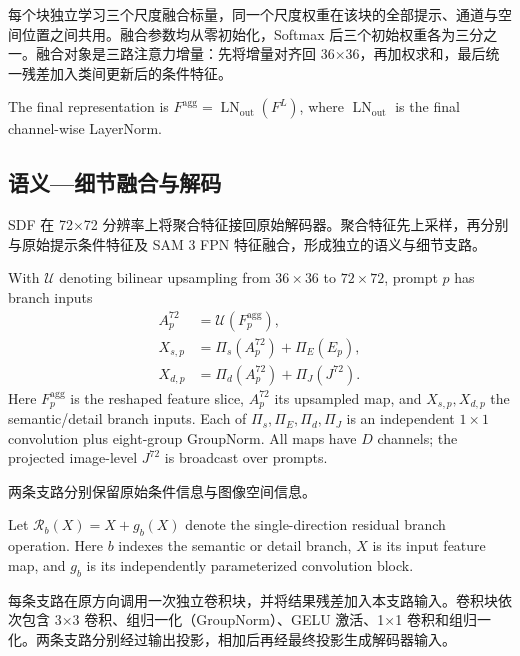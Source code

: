 每个块独立学习三个尺度融合标量，同一个尺度权重在该块的全部提示、通道与空间位置之间共用。融合参数均从零初始化，Softmax 后三个初始权重各为三分之一。融合对象是三路注意力增量：先将增量对齐回 36×36，再加权求和，最后统一残差加入类间更新后的条件特征。

The final representation is $F^{\mathrm{agg}}=\operatorname{LN}_{\mathrm{out}}(F^L)$, where $\operatorname{LN}_{\mathrm{out}}$ is the final channel-wise LayerNorm.



\subsection{语义—细节融合与解码}
SDF 在 72×72 分辨率上将聚合特征接回原始解码器。聚合特征先上采样，再分别与原始提示条件特征及 SAM 3 FPN 特征融合，形成独立的语义与细节支路。

With $\mathcal U$ denoting bilinear upsampling from $36\times36$ to $72\times72$, prompt $p$ has branch inputs
\begin{equation}
\begin{aligned}
 A_p^{72} &= \mathcal U(F_p^{\mathrm{agg}}),\\
 X_{s,p} &= \Pi_s(A_p^{72})+\Pi_E(E_p),\\
 X_{d,p} &= \Pi_d(A_p^{72})+\Pi_J(J^{72}).
\end{aligned}
\label{eq:sdf_inputs}
\end{equation}
Here $F_p^{\mathrm{agg}}$ is the reshaped feature slice, $A_p^{72}$ its upsampled map, and $X_{s,p},X_{d,p}$ the semantic/detail branch inputs. Each of $\Pi_s,\Pi_E,\Pi_d,\Pi_J$ is an independent $1\times1$ convolution plus eight-group GroupNorm. All maps have $D$ channels; the projected image-level $J^{72}$ is broadcast over prompts.

两条支路分别保留原始条件信息与图像空间信息。

Let $\mathcal R_b(X)=X+g_b(X)$ denote the single-direction residual branch operation. Here $b$ indexes the semantic or detail branch, $X$ is its input feature map, and $g_b$ is its independently parameterized convolution block.

每条支路在原方向调用一次独立卷积块，并将结果残差加入本支路输入。卷积块依次包含 3×3 卷积、组归一化（GroupNorm）、GELU 激活、1×1 卷积和组归一化。两条支路分别经过输出投影，相加后再经最终投影生成解码器输入。

